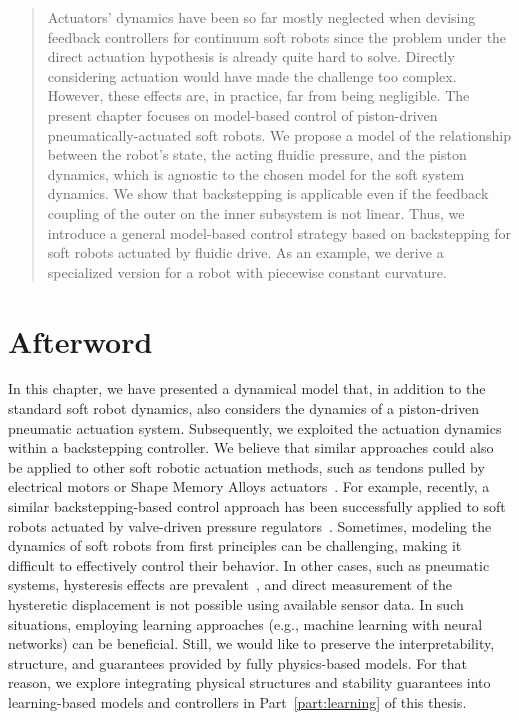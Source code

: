 \pagebreak

\begin{abstract}
    Actuators' dynamics have been so far mostly neglected when devising feedback controllers for continuum soft robots since the problem under the direct actuation hypothesis is already quite hard to solve. Directly considering actuation would have made the challenge too complex. However, these effects are, in practice, far from being negligible. The present chapter focuses on model-based control of piston-driven pneumatically-actuated soft robots. We propose a model of the relationship between the robot's state, the acting fluidic pressure, and the piston dynamics, which is agnostic to the chosen model for the soft system dynamics. 
    We show that backstepping is applicable even if the feedback coupling of the outer on the inner subsystem is not linear.
    Thus, we introduce a general model-based control strategy based on backstepping for soft robots actuated by fluidic drive. As an example, we derive a specialized version for a robot with piecewise constant curvature. 
\end{abstract}


\newpage








\section*{Afterword}
In this chapter, we have presented a dynamical model that, in addition to the standard soft robot dynamics, also considers the dynamics of a piston-driven pneumatic actuation system. Subsequently, we exploited the actuation dynamics within a backstepping controller.
We believe that similar approaches could also be applied to other soft robotic actuation methods, such as tendons pulled by electrical motors or Shape Memory Alloys actuators~\cite{zaidi2021actuation}.
For example, recently, a similar backstepping-based control approach has been successfully applied to soft robots actuated by valve-driven pressure regulators~\cite{franco2024model}.
Sometimes, modeling the dynamics of soft robots from first principles can be challenging, making it difficult to effectively control their behavior. In other cases, such as pneumatic systems, hysteresis effects are prevalent~\cite{vo2010new}, and direct measurement of the hysteretic displacement is not possible using available sensor data.
In such situations, employing learning approaches (e.g., machine learning with neural networks) can be beneficial. Still, we would like to preserve the interpretability, structure, and guarantees provided by fully physics-based models. For that reason, we explore integrating physical structures and stability guarantees into learning-based models and controllers in Part~\ref{part:learning} of this thesis.

